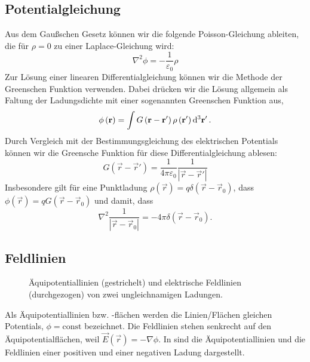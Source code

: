 \subsection{Potentialgleichung}

Aus dem Gaußschen Gesetz können wir die folgende Poisson-Gleichung ableiten, die für $\rho =0$ zu einer Laplace-Gleichung wird:
\begin{equation}
	\label{3.8}
	\boxed{\nabla ^{2}\phi =-\frac{1}{\varepsilon _{0}}\rho }
\end{equation}
Zur Lösung einer linearen Differentialgleichung können wir die Methode der Greenschen Funktion verwenden. Dabei drücken wir die Lösung allgemein als Faltung der Ladungsdichte mit einer sogenannten Greenschen Funktion aus,
\begin{equation}
	\label{3.9}
	\phi \left(\vec {r}\right)=\int G\left(\vec {r}-\vec {r}'\right)\rho \left(\vec {r}'\right)\diffa[3]{\vec{r}'}.
\end{equation}
Durch Vergleich mit der Bestimmungsgleichung des elektrischen Potentials können wir die Greensche Funktion für diese Differentialgleichung ablesen:
\begin{equation}
	\label{3.10}
	G\left(\vec {r}-\vec {r}'\right)=\frac{1}{4\pi \varepsilon _{0}}\frac{1}{\left| \vec {r}-\vec {r}'\right| }
\end{equation}
Insbesondere gilt für eine Punktladung $\rho \left(\vec {r}\right)=q\delta \left(\vec {r}-\vec {r}_{0}\right)$, dass $\phi \left(\vec {r}\right)=qG\left(\vec {r}-\vec {r}_{0}\right)$ und damit, dass
\begin{equation*}
	\nabla ^{2}\frac{1}{\left| \vec {r}-\vec {r}_{0}\right| }=-4\pi \delta \left(\vec {r}-\vec {r}_{0}\right).
\end{equation*}



\subsection{Feldlinien}

\begin{figure}[htb]
	\centering
	\tFigBoundaryConditionsDielectrica
	\caption{Äquipotentiallinien (gestrichelt) und elektrische Feldlinien (durchgezogen) von zwei ungleichnamigen Ladungen. }
	\label{fig:dipole_field_potential}
\end{figure}

Als Äquipotentiallinien bzw. -flächen werden die Linien/Flächen gleichen Potentials, $\phi =\text{const}$ bezeichnet. Die Feldlinien stehen senkrecht auf den Äquipotentialflächen, weil $\vec {E}\left(\vec {r}\right)=-\nabla \phi $. In  sind die Äquipotentiallinien und die Feldlinien einer positiven und einer negativen Ladung dargestellt.



